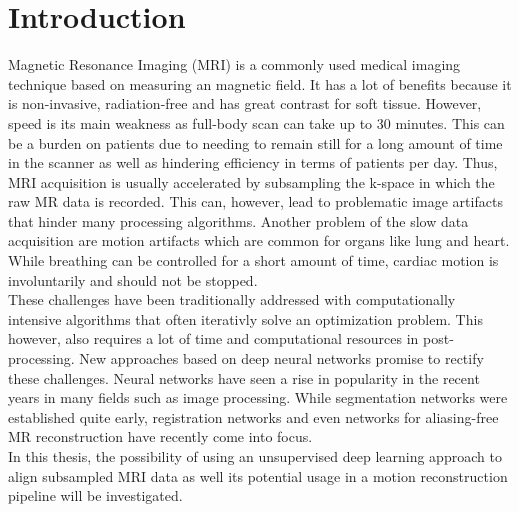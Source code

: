 
\chapter{Introduction} \label{Ch:Introduction}
Magnetic Resonance Imaging (MRI) is a commonly used medical imaging technique based on measuring an magnetic field. It has a lot of benefits because it is non-invasive, radiation-free and has great contrast for soft tissue. However, speed is its main weakness as full-body scan can take up to 30 minutes. This can be a burden on patients due to needing to remain still for a long amount of time in the scanner as well as hindering efficiency in terms of patients per day. Thus, MRI acquisition is usually accelerated by subsampling the k-space in which the raw MR data is recorded. This can, however, lead to problematic image artifacts that hinder many processing algorithms. Another problem of the slow data acquisition are motion artifacts which are common for organs like lung and heart. While breathing can be controlled for a short amount of time, cardiac motion is involuntarily and should not be stopped. \\
These challenges have been traditionally addressed with computationally intensive algorithms that often iterativly solve an optimization problem. This however, also requires a lot of time and computational resources in post-processing. New approaches based on deep neural networks promise to rectify these challenges. Neural networks have seen a rise in popularity in the recent years in many fields such as image processing. While segmentation networks were established quite early, registration networks and even networks for aliasing-free MR reconstruction have recently come into focus.\\
In this thesis, the possibility of using an unsupervised deep learning approach to align subsampled MRI data as well its potential usage in a motion reconstruction pipeline will be investigated.

